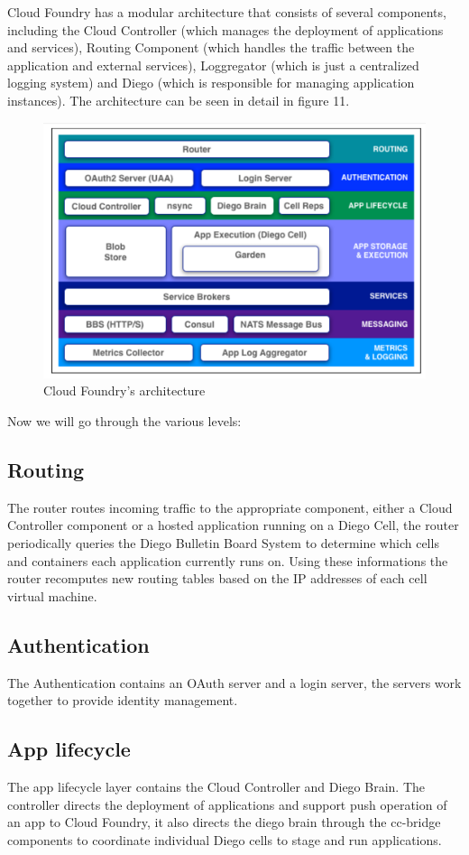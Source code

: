 Cloud Foundry has a modular architecture that consists of several components, including the Cloud Controller (which manages the deployment of applications and services), Routing Component (which handles the traffic between the application and external services), Loggregator (which is just a centralized logging system) and Diego (which is responsible for managing application instances). The architecture can be seen in detail in figure 11.
\begin{figure}
	\centering
	\includegraphics[scale=0.5]{img/Cloud_Foundry.png}
	\caption{Cloud Foundry's architecture}
\end{figure}
Now we will go through the various levels:

\subsection{Routing}
The router routes incoming traffic to the appropriate component, either a Cloud Controller component or a hosted application running on a Diego Cell, the router periodically queries the Diego Bulletin Board System to determine which cells and containers each application currently runs on. Using these informations the router recomputes new routing tables based on the IP addresses of each cell virtual machine.

\subsection{Authentication}
The Authentication contains an OAuth server and a login server, the servers work together to provide identity management.

\subsection{App lifecycle}
The app lifecycle layer contains the Cloud Controller and Diego Brain. The controller directs the deployment of applications and support push operation of an app to Cloud Foundry, it also directs the diego brain through the cc-bridge components to coordinate individual Diego cells to stage and run applications.

